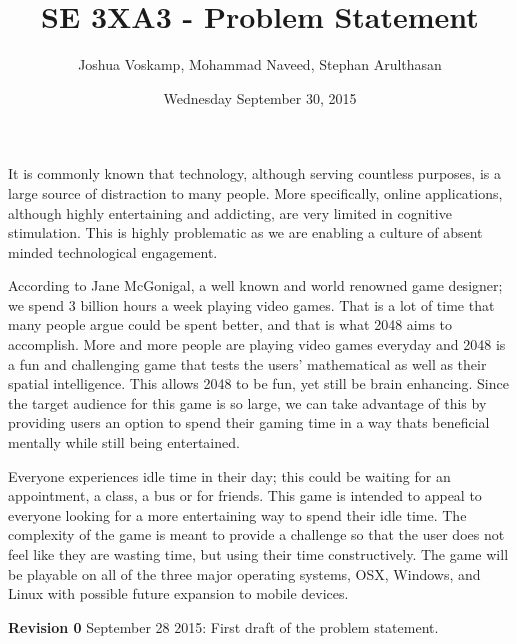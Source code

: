 \documentclass[12pt]{report}
\begin{document}
\title{SE 3XA3 - Problem Statement}
\author{Joshua Voskamp, Mohammad Naveed, Stephan Arulthasan}
\date{Wednesday September 30, 2015}

\maketitle

It is commonly known that technology, although serving countless purposes, is a large source of distraction to many people. More specifically, online applications, although highly entertaining and addicting, are very limited in cognitive stimulation. This is highly problematic as we are enabling a culture of absent minded technological engagement. \par \vspace{5mm}

According to Jane McGonigal, a well known and world renowned game designer; we spend 3 billion hours a week playing video games. That is a lot of time that many people argue could be spent better, and that is what 2048 aims to accomplish. More and more people are playing video games everyday and 2048 is a fun and challenging game that tests the users' mathematical as well as their spatial intelligence. This allows 2048 to be fun, yet still be brain enhancing. Since the target audience for this game is so large, we can take advantage of this by providing users an option to spend their gaming time in a way thats beneficial mentally while still being entertained. \par \vspace{5mm}

Everyone experiences idle time in their day; this could be waiting for an appointment, a class, a bus or for friends. This game is intended to appeal to everyone looking for a more entertaining way to spend their idle time. The complexity of the game is meant to provide a challenge so that the user does not feel like they are wasting time, but using their time constructively. 
The game will be playable on all of the three major operating systems, OSX, Windows, and Linux with possible future expansion to mobile devices. \vspace{10mm}

\textbf{Revision 0} September 28 2015: First draft of the problem statement. 
\end{document}
